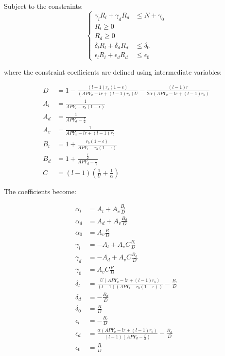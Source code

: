 \documentclass{article}
\begin{document}
Subject to the constraints:
    \begin{equation}
    \left\{
    \begin{aligned}
    \gamma_l R_l + \gamma_d R_d &\leq N + \gamma_0 \\
    R_l \geq 0 \\
    R_d \geq 0 \\
    \delta_l R_l + \delta_d R_d &\leq \delta_0 \\
    \epsilon_l R_l + \epsilon_d R_d &\leq \epsilon_0
    \end{aligned}
    \right.
    \end{equation}

where the constraint coefficients are defined using intermediate variables:

\begin{align}
D &= 1 - \frac{(l-1) r_b(1-\epsilon)}{(APY_v - lr + (l-1)r_b) U} - \frac{(l-1) r}{2\alpha (APY_v - lr + (l-1)r_b)} \\
A_l &= \frac{1}{APY_l - r_b(1-\epsilon)} \\
A_d &= \frac{1}{APY_d - \frac{r}{2}} \\
A_v &= \frac{1}{APY_v - lr + (l-1)r_b} \\
B_l &= 1 + \frac{r_b(1-\epsilon)}{APY_l - r_b(1-\epsilon)} \\
B_d &= 1 + \frac{\frac{r}{2}}{APY_d - \frac{r}{2}} \\
C &= (l-1)\left(\frac{1}{U} + \frac{1}{\alpha}\right)
\end{align}

The coefficients become:

\begin{align}
\alpha_l &= A_l + A_v \frac{B_l}{D} \\
\alpha_d &= A_d + A_v \frac{B_d}{D} \\
\alpha_0 &= A_v \frac{R}{D} \\
\gamma_l &= -A_l + A_v C \frac{B_l}{D} \\
\gamma_d &= -A_d + A_v C \frac{B_d}{D} \\
\gamma_0 &= A_v C \frac{R}{D} \\
\delta_l &= \frac{U(APY_v - lr + (l-1)r_b)}{(l-1)(APY_l - r_b(1-\epsilon))} - \frac{B_l}{D} \\
\delta_d &= -\frac{B_d}{D} \\
\delta_0 &= \frac{R}{D} \\
\epsilon_l &= -\frac{B_l}{D} \\
\epsilon_d &= \frac{\alpha(APY_v - lr + (l-1)r_b)}{(l-1)(APY_d - \frac{r}{2})} - \frac{B_d}{D} \\
\epsilon_0 &= \frac{R}{D}
\end{align}
\end{document}
